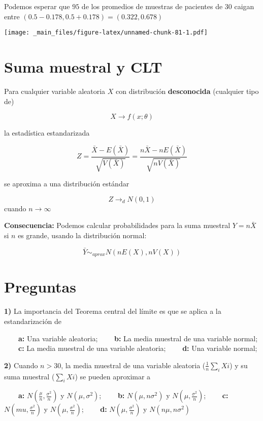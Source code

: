 \documentclass[
]{book}
\begin{document}
Podemos esperar que \(95%
\) de los promedios de muestras de pacientes de \(30\) caigan entre
\((0.5-0.178, 0.5+0.178)= (0.322, 0.678)\)

\texttt{[image: \_main\_files/figure-latex/unnamed-chunk-81-1.pdf]}

\hypertarget{suma-muestral-y-clt}{%
\section{Suma muestral y CLT}\label{suma-muestral-y-clt}}

Para cualquier variable aleatoria \(X\) con distribución \textbf{desconocida} (cualquier tipo de)

\[X \rightarrow f(x; \theta)\]

la estadística estandarizada

\[Z=\frac{\bar{X}-E(\bar{X})}{\sqrt{V(\bar{X})}}=\frac{n\bar{X}-nE(\bar{X})}{\sqrt{nV(\bar{X})}}\]

se aproxima a una distribución estándar

\[Z \rightarrow_d N(0,1)\] cuando \(n\rightarrow \infty\)

\textbf{Consecuencia:} Podemos calcular probabilidades para la suma muestral \(Y=n\bar{X}\) si \(n\) es grande, usando la distribución normal:

\[\bar{Y} \sim_{aprox} N(nE(X), nV(X))\]

\hypertarget{preguntas-8}{%
\section{Preguntas}\label{preguntas-8}}

\textbf{1)} La importancia del Teorema central del límite es que se aplica a la estandarización de

\textbf{\(\qquad\)a:} Una variable aleatoria;
\textbf{\(\qquad\)b:} La media muestral de una variable normal;
\textbf{\(\qquad\)c:} La media muestral de una variable aleatoria;
\textbf{\(\qquad\)d:} Una variable normal;

\textbf{2)} Cuando \(n>30\), la media muestral de una variable aleatoria (\(\frac{1}{n}\sum_i Xi\)) y su suma muestral (\(\sum_i Xi\)) se pueden aproximar a

\textbf{\(\qquad\)a:} \(N(\frac{\mu}{n}, \frac{\sigma^2}{n})\) y \(N(\mu, \sigma^2)\);
\textbf{\(\qquad\)b:} \(N(\mu, n\sigma^2)\) y \(N(\mu, \frac{\sigma^2}{n})\);
\textbf{\(\qquad\)c:} \(N(mu, \frac{\sigma^2}{n})\) y \(N(\mu, \frac{\sigma^2}{n})\);
\textbf{\(\qquad\)d:} \(N(\mu, \frac{\sigma^2}{n})\) y \(N(n\mu, n\sigma^2)\)
\end{document}
